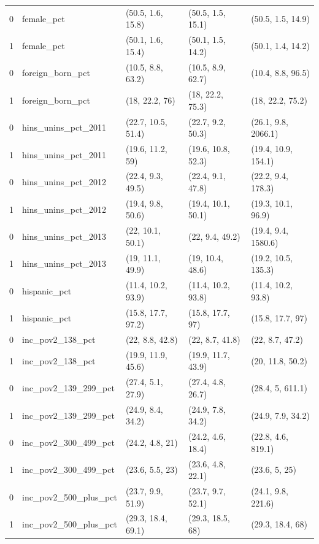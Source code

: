 \documentclass{article}
\begin{document}
\begin{appendix}
\begin{table}[ht]
\begin{tabular}{rllll}
  0 & female\_pct & (50.5, 1.6, 15.8) & (50.5, 1.5, 15.1) & (50.5, 1.5, 14.9) \\ 
  1 & female\_pct & (50.1, 1.6, 15.4) & (50.1, 1.5, 14.2) & (50.1, 1.4, 14.2) \\ 
  0 & foreign\_born\_pct & (10.5, 8.8, 63.2) & (10.5, 8.9, 62.7) & (10.4, 8.8, 96.5) \\ 
  1 & foreign\_born\_pct & (18, 22.2, 76) & (18, 22.2, 75.3) & (18, 22.2, 75.2) \\ 
  0 & hins\_unins\_pct\_2011 & (22.7, 10.5, 51.4) & (22.7, 9.2, 50.3) & (26.1, 9.8, 2066.1) \\ 
  1 & hins\_unins\_pct\_2011 & (19.6, 11.2, 59) & (19.6, 10.8, 52.3) & (19.4, 10.9, 154.1) \\ 
  0 & hins\_unins\_pct\_2012 & (22.4, 9.3, 49.5) & (22.4, 9.1, 47.8) & (22.2, 9.4, 178.3) \\ 
  1 & hins\_unins\_pct\_2012 & (19.4, 9.8, 50.6) & (19.4, 10.1, 50.1) & (19.3, 10.1, 96.9) \\ 
  0 & hins\_unins\_pct\_2013 & (22, 10.1, 50.1) & (22, 9.4, 49.2) & (19.4, 9.4, 1580.6) \\ 
  1 & hins\_unins\_pct\_2013 & (19, 11.1, 49.9) & (19, 10.4, 48.6) & (19.2, 10.5, 135.3) \\ 
    0 & hispanic\_pct & (11.4, 10.2, 93.9) & (11.4, 10.2, 93.8) & (11.4, 10.2, 93.8) \\ 
  1 & hispanic\_pct & (15.8, 17.7, 97.2) & (15.8, 17.7, 97) & (15.8, 17.7, 97) \\ 
  0 & inc\_pov2\_138\_pct & (22, 8.8, 42.8) & (22, 8.7, 41.8) & (22, 8.7, 47.2) \\ 
  1 & inc\_pov2\_138\_pct & (19.9, 11.9, 45.6) & (19.9, 11.7, 43.9) & (20, 11.8, 50.2) \\ 
  0 & inc\_pov2\_139\_299\_pct & (27.4, 5.1, 27.9) & (27.4, 4.8, 26.7) & (28.4, 5, 611.1) \\ 
  1 & inc\_pov2\_139\_299\_pct & (24.9, 8.4, 34.2) & (24.9, 7.8, 34.2) & (24.9, 7.9, 34.2) \\ 
  0 & inc\_pov2\_300\_499\_pct & (24.2, 4.8, 21) & (24.2, 4.6, 18.4) & (22.8, 4.6, 819.1) \\ 
  1 & inc\_pov2\_300\_499\_pct & (23.6, 5.5, 23) & (23.6, 4.8, 22.1) & (23.6, 5, 25) \\ 
  0 & inc\_pov2\_500\_plus\_pct & (23.7, 9.9, 51.9) & (23.7, 9.7, 52.1) & (24.1, 9.8, 221.6) \\ 
  1 & inc\_pov2\_500\_plus\_pct & (29.3, 18.4, 69.1) & (29.3, 18.5, 68) & (29.3, 18.4, 68) \\ 

\end{tabular}
\end{table}
\end{appendix}
\end{document}

